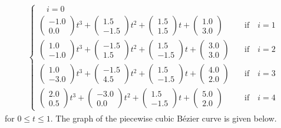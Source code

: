 \begin{egg}
\begin{align*}
\begin{cases}
\quad i = 0 \\[1em]
\begin{pmatrix} -1.0 \\ 0.0 \end{pmatrix} t^3
+ \begin{pmatrix} 1.5 \\ -1.5 \end{pmatrix} t^2
+ \begin{pmatrix} 1.5 \\ 1.5 \end{pmatrix} t
+ \begin{pmatrix} 1.0 \\ 3.0 \end{pmatrix} & \quad \text{if}
\quad i = 1 \\[1em]
\begin{pmatrix} 1.0 \\ -1.0 \end{pmatrix} t^3
+ \begin{pmatrix} -1.5 \\ 1.5 \end{pmatrix} t^2
+ \begin{pmatrix} 1.5 \\ -1.5 \end{pmatrix} t
+ \begin{pmatrix} 3.0 \\ 3.0 \end{pmatrix} & \quad \text{if}
\quad i = 2 \\[1em]
\begin{pmatrix} 1.0 \\ -3.0 \end{pmatrix} t^3
+ \begin{pmatrix} -1.5 \\ 4.5 \end{pmatrix} t^2
+ \begin{pmatrix} 1.5 \\ -1.5 \end{pmatrix} t
+ \begin{pmatrix} 4.0 \\ 2.0 \end{pmatrix} & \quad \text{if}
\quad i = 3 \\[1em]
\begin{pmatrix} 2.0 \\ 0.5 \end{pmatrix} t^3
+ \begin{pmatrix} -3.0 \\ 0.0 \end{pmatrix} t^2
+ \begin{pmatrix} 1.5 \\ -1.5 \end{pmatrix} t
+ \begin{pmatrix} 5.0 \\ 2.0 \end{pmatrix} & \quad \text{if}
\quad i = 4
\end{cases}
\end{align*}
for $0 \leq t \leq 1$.  The graph of the piecewise cubic Bézier
curve is given below.
\end{egg}

